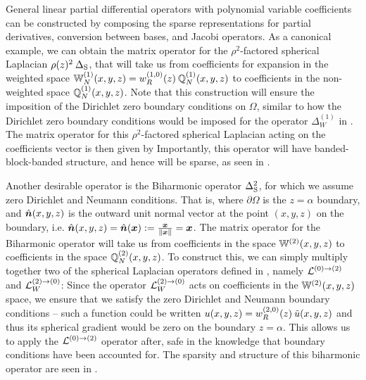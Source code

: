 General linear partial differential operators with polynomial variable coefficients can be constructed by composing the sparse representations for partial derivatives, conversion between bases, and Jacobi operators. As a canonical example, we can obtain the matrix operator for the $\rho^2$-factored spherical Laplacian $\rho(z)^2 \: \Delta_{\rm S}$, that will take us from coefficients for expansion in the weighted space $\mathbb{W}_N^{(1)}(x,y,z) = w_R^{(1,0)}(z) \: {\mathbb{Q}}_{N}^{(1)}(x,y,z)$ to coefficients in the non-weighted space ${\mathbb{Q}}_{N}^{(1)}(x,y,z)$. Note that this construction will ensure the imposition of the Dirichlet zero boundary conditions on $\Omega$, similar to how the Dirichlet zero boundary conditions would be imposed for the operator $\Delta^{(1)}_W$ in . The matrix operator for this $\rho^2$-factored spherical Laplacian acting on the coefficients vector is then given by
Importantly, this operator will have banded-block-banded structure, and hence will be sparse, as seen in .

Another desirable operator is the Biharmonic operator $\Delta_{\rm S}^2$, for which we assume zero Dirichlet and Neumann conditions. That is, 
where $\partial\Omega$ is the $z=\alpha$ boundary, and $\hat{\bm{n}}(x,y,z)$ is the outward unit normal vector at the point $(x,y,z)$ on the boundary, i.e. $\hat{\bm{n}}(x,y,z) = \hat{\bm{n}}(\bm{x}) := {\bm{x} \over \left\| \bm{x} \right\|} = \bm{x}$. The matrix operator for the Biharmonic operator will take us from coefficients in the space $\mathbb{W}^{(2)}(x,y,z)$ to coefficients in the space ${\mathbb{Q}}_{N}^{(2)}(x,y,z)$. To construct this, we can simply multiply together two of the spherical Laplacian operators defined in , namely $\mathcal{L}^{(0)\to(2)}$ and $\mathcal{L}_W^{(2)\to(0)}$:
Since the operator $\mathcal{L}_W^{(2)\to(0)}$ acts on coefficients in the $\mathbb{W}^{(2)}(x,y,z)$ space, we ensure that we satisfy the zero Dirichlet and Neumann boundary conditions -- such a function could be written $u(x,y,z) = w_R^{(2,0)}(z) \: \tilde u(x,y,z)$ and thus its spherical gradient would be zero on the boundary $z = \alpha$. This allows us to apply the $\mathcal{L}^{(0)\to(2)}$ operator after, safe in the knowledge that boundary conditions have been accounted for. The sparsity and structure of this biharmonic operator are seen in .


